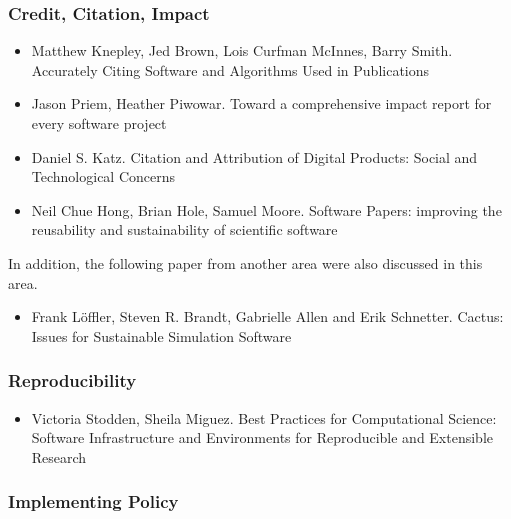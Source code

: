 \documentclass[11pt, oneside]{amsart}
\begin{document}
\subsubsection*{Credit, Citation, Impact}

\begin{itemize}

\item Matthew Knepley, Jed Brown, Lois Curfman McInnes, Barry
  Smith. Accurately Citing Software and Algorithms Used in
  Publications \cite{Knepley_WSSSPE}

\item Jason Priem, Heather Piwowar. Toward a comprehensive impact
  report for every software project \cite{Priem_WSSSPE}

\item Daniel S. Katz. Citation and Attribution of Digital Products:
  Social and Technological Concerns \cite{Katz2_WSSSPE}

\item Neil Chue Hong, Brian Hole, Samuel Moore. Software Papers:
  improving the reusability and sustainability of scientific software
  \cite{Chue_Hong_WSSSPE}

\end{itemize}

In addition, the following paper from another area were also discussed
in this area.

\begin{itemize}

\item Frank L\"{o}ffler, Steven R. Brandt, Gabrielle Allen and Erik
  Schnetter. Cactus: Issues for Sustainable Simulation Software
  \cite{Loffler_WSSSPE}

\end{itemize}

\subsubsection*{Reproducibility}

\begin{itemize}

\item Victoria Stodden, Sheila Miguez. Best Practices for
  Computational Science: Software Infrastructure and Environments for
  Reproducible and Extensible Research \cite{Stodden_WSSSPE}

\end{itemize}

\subsubsection*{Implementing Policy}
\end{document}

